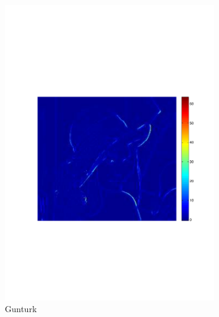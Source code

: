 \documentclass[twocolumn]{el-author}
\begin{document}
\begin{figure}[t]
\begin{subfigure}[b]{0.32\linewidth}
    \includegraphics[width=\linewidth]{5Gunturk2}
    \caption{Gunturk~\cite{Gunturk_TIP_2011}}
    \label{fig:minimax_path:path}
\end{subfigure}
\begin{subfigure}[b]{0.32\linewidth}
    \centering

\end{subfigure}
\end{figure}
\end{document}
